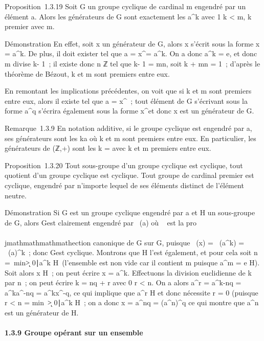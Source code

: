 Proposition~1.3.19 Soit G un groupe cyclique de cardinal m engendré par
un élément a. Alors les générateurs de G sont exactement les
a^k avec 1 \leq k \textless{} m, k premier avec m.

Démonstration En effet, soit x un générateur de G, alors x s'écrit sous
la forme x = a^k. De plus, il doit exister \ell tel que a =
x^\ell = a^k\ell. On a donc a^k = e, et
donc m divise k\ell - 1~; il existe donc n \in ℤ tel que k\ell - 1 = mn, soit k\ell
+ mn = 1~; d'après le théorème de Bézout, k et m sont premiers entre
eux.

En remontant les implications précédentes, on voit que si k et m sont
premiers entre eux, alors il existe \ell tel que a = x^\ell~; tout
élément de G s'écrivant sous la forme a^q s'écrira également
sous la forme x^\ellq et donc x est un générateur de G.

Remarque~1.3.9 En notation additive, si le groupe cyclique est engendré
par a, ses générateurs sont les ka où k et m sont premiers entre eux. En
particulier, les générateurs de (ℤ,+) sont les
k = \overlinek avec k et
m premiers entre eux.

Proposition~1.3.20 Tout sous-groupe d'un groupe cyclique est cyclique,
tout quotient d'un groupe cyclique est cyclique. Tout groupe de cardinal
premier est cyclique, engendré par n'importe lequel de ses éléments
distinct de l'élément neutre.

Démonstration Si G est un groupe cyclique engendré par a et H un
sous-groupe de G, alors G\diagupH est clairement engendré par \pi~(a) où \pi~ est la
pro\\\\jmathmathmathmathection canonique de G sur G\diagupH, puisque \pi~(x) = \pi~(a^k) =
\pi~(a)^k~; donc G\diagupH est cyclique. Montrons que H l'est
également, et pour cela soit n =\
min\k \textgreater{}
0∣a^k \in H\
(l'ensemble est non vide car il contient m puisque a^m = e \in
H). Soit alors x \in H~; on peut écrire x = a^k. Effectuons la
division euclidienne de k par n~; on peut écrire k = nq + r avec 0 \leq r
\textless{} n. On a alors a^r = a^k-nq =
a^ka^-nq = a^kx^-q, ce qui
implique que a^r \in H et donc nécessite r = 0 (puisque r
\textless{} n = min~\k
\textgreater{} 0∣a^k \in
H\)~; on a donc x = a^nq =
(a^n)^q ce qui montre que a^n est un
générateur de H.

\paragraph{1.3.9 Groupe opérant sur un ensemble}

